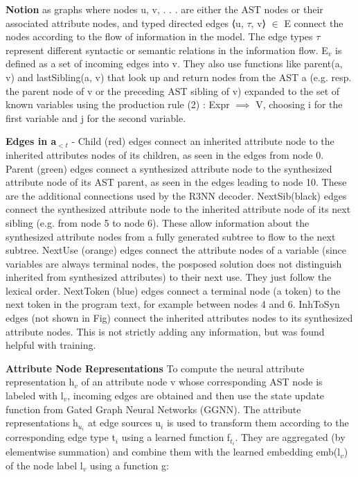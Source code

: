 \documentclass{article}
\begin{document}
\textbf{Notion} as graphs where nodes u, v, . . . are either the AST nodes or their associated attribute nodes, and typed directed edges ⟨u, $\tau$, v⟩ $\in$ E connect the nodes according to the flow of information in the model. The edge types $\tau$ represent different syntactic or semantic relations in the information flow. E$_v$ is defined as a set of incoming edges into v. They also use functions like parent(a, v) and lastSibling(a, v) that look up and return nodes from the AST a (e.g. resp. the parent node of v or the preceding AST sibling of v) expanded to the set of known variables using the production rule (2) : Expr $\implies$ V, choosing i for the first variable and j for the second variable.

\textbf{Edges in a$_{<t}$} - Child (red) edges connect an inherited attribute node to the inherited attributes nodes of its children, as seen in the edges from node 0. Parent (green) edges connect a synthesized attribute node to the synthesized attribute node of its AST parent, as seen in the edges leading to node 10. These are the additional connections used by the R3NN decoder. NextSib(black) edges connect the synthesized attribute node to the inherited attribute node of its next sibling (e.g. from node 5 to node 6). These allow information about the synthesized attribute nodes from a fully generated subtree to flow to the next subtree. NextUse (orange) edges connect the attribute nodes of a variable (since variables are always terminal nodes, the posposed solution does not distinguish inherited from synthesized attributes) to their next use. They just follow the lexical order. NextToken (blue) edges connect a terminal node (a token) to the next token in the program text, for example between nodes 4 and 6. InhToSyn edges (not shown in Fig) connect the inherited attributes nodes to its synthesized attribute nodes. This is not strictly adding any information, but was found helpful with training.

\textbf{Attribute Node Representations} To compute the neural attribute representation h$_v$ of an attribute node v whose corresponding AST node is labeled with l$_v$, incoming edges are obtained and then use the state update function from Gated Graph Neural Networks (GGNN). The attribute representations h$_{u_i}$ at edge sources u$_i$ is used to transform them according to the corresponding edge type t$_i$ using a learned function f$_{t_i}$. They are aggregated (by elementwise summation) and combine them with the learned embedding emb(l$_v$) of the node label l$_v$ using a function g:
\end{document}
